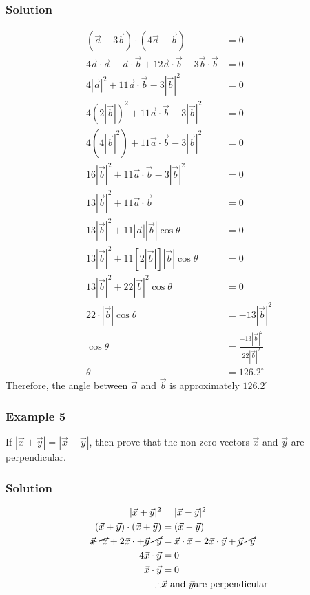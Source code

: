 \documentclass{article}
\begin{document}
\subsubsection*{Solution}
\begin{align*}
    (\vec{a}+3\vec{b})\cdot (4\vec{a}+\vec{b})&=0\\
    4\vec{a}\cdot \vec{a} -\vec{a}\cdot \vec{b}+12\vec{a} \cdot \vec{b}-3\vec{b}\cdot \vec{b}&=0\\
    4|\vec{a}|^2+11\vec{a}\cdot \vec{b}-3|\vec{b}|^2&=0\\
    4(2|\vec{b}|)^2+11\vec{a}\cdot \vec{b}-3|\vec{b}|^2&=0\\
    4(4|\vec{b}|^2)+11\vec{a}\cdot \vec{b}-3|\vec{b}|^2&=0\\
    16|\vec{b}|^2+11\vec{a} \cdot \vec{b}-3|\vec{b}|^2&=0\\
    13|\vec{b}|^2+11\vec{a}\cdot \vec{b}&=0\\
    13|\vec{b}|^2+11|\vec{a}||\vec{b}|\cos \theta&=0\\
    13|\vec{b}|^2+11[2|\vec{b}|]|\vec{b}|\cos\theta&=0\\
    13|\vec{b}|^2+22|\vec{b}|^2\cos \theta&=0\\
    22 \cdot |\vec{b}|\cos \theta&=-13|\vec{b}|^2\\
    \cos\theta &= \frac{-13|\vec{b}|^2}{22|\vec{b}|^2}\\
    \theta&=126.2^{\circ} 
\end{align*}
Therefore, the angle between $\vec{a}$ and $\vec{b}$ is approximately $126.2^{\circ}$

\subsubsection*{Example 5}
If $|\vec{x}+\vec{y}|=|\vec{x}-\vec{y}|$, then prove that the non-zero vectors $\vec{x}$ and $\vec{y}$ are perpendicular.
\subsubsection*{Solution}
\begin{align*}
    |\vec{x}+\vec{y}|^2&=|\vec{x}-\vec{y}|^2\\
    (\vec{x}+\vec{y})\cdot(\vec{x}+\vec{y})&=(\vec{x}-\vec{y})\\
    \cancel{\vec{x}\cdot\vec{x}}+2\vec{x}\cdot +\cancel{\vec{y}\cdot \vec{y}}&=\vec{x}\cdot \vec{x}-2\vec{x}\cdot \vec{y}+\cancel{\vec{y}\cdot \vec{y}}\\
    4\vec{x}\cdot \vec{y}&=0\\
    \vec{x} \cdot \vec{y}&=0\\
    \therefore &\vec{x} \text{ and } \vec{y} \text{are perpendicular}
\end{align*}
\end{document}
